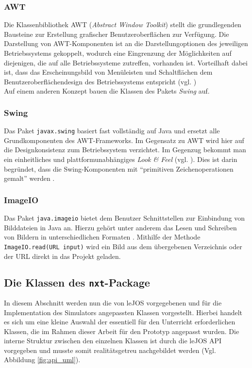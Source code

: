 \documentclass[paper=a4, DIV=calc, BCOR=15mm, twoside=on, onecolumn=on, open = right, titlepage =on, parskip =half, headsepline = on, footsepline = on, chapterprefix = off, appendixprefix = off, fontsize = 12pt, numbers = noenddot, abstract = on]{scrbook}
\begin{document}
\subsubsection*{AWT}

Die Klassenbibliothek AWT (\emph{Abstract Window Toolkit}) stellt die grundlegenden Bausteine zur Erstellung grafischer Benutzeroberflächen zur Verfügung. Die Darstellung von AWT-Komponenten ist an die Darstellungoptionen des jeweiligen Betriebssystems gekoppelt, wodurch eine Eingrenzung der Möglichkeiten auf diejenigen, die auf alle Betriebssysteme zutreffen, vorhanden ist. Vorteilhaft dabei ist, dass das Erscheinungsbild von Menüleisten und Schaltflächen dem Benutzeroberflächendesign des Betriebssystems entspricht (vgl. \cite[S.279]{abts:15})\\
Auf einem anderen Konzept bauen die Klassen des Pakets \emph{Swing} auf. 

\subsubsection*{Swing}

Das Paket \texttt{javax.swing} basiert fast vollständig auf Java und ersetzt alle Grundkomponenten des AWT-Frameworks. Im Gegensatz zu AWT wird hier auf die Designkonsistenz zum Betriebssystem verzichtet. Im Gegenzug bekommt man ein einheitliches und plattformunabhängiges \emph{Look \& Feel} (vgl. \cite[S.279]{abts:15}). Dies ist darin begründet, dass die Swing-Komponenten mit "`primitiven Zeichenoperationen gemalt"' werden \cite[S.1018]{ullenboom:12}.


\subsubsection*{ImageIO}

Das Paket \texttt{java.imageio} bietet dem Benutzer Schnittstellen zur Einbindung von Bilddateien in Java an. Hierzu gehört unter anderem das Lesen und Schreiben von Bildern in unterschiedlichen Formaten \cite[S.1280]{ullenboom:12}. Mithilfe der Methode \texttt{ImageIO.read(URL input)} wird ein Bild aus dem übergebenen Verzeichnis oder der URL direkt in das Projekt geladen. 


\par \singlespacing
\subsection{Die Klassen des \texttt{nxt}-Package}
\label{sec:API}
\onehalfspacing
In diesem Abschnitt werden nun die von leJOS vorgegebenen und für die Implementation des Simulators angepassten Klassen vorgestellt. Hierbei handelt es sich um eine kleine Auswahl der essentiell für den Unterricht erforderlichen Klassen, die im Rahmen dieser Arbeit für den Prototyp angepasst wurden. Die interne Struktur zwischen den einzelnen Klassen ist durch die leJOS API vorgegeben und musste somit realitätsgetreu nachgebildet werden (Vgl. Abbildung \ref{fig:api_uml}).
\end{document}
